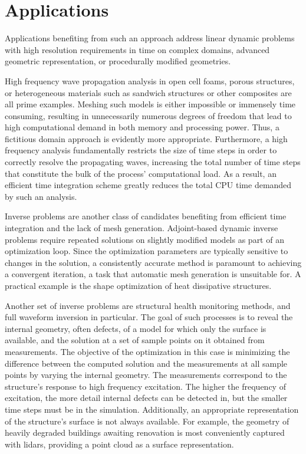 %
\section{Applications}
\label{section:applications}
%

Applications benefiting from such an approach address linear dynamic problems with high resolution requirements in time on complex domains, advanced geometric representation, or procedurally modified geometries.

High frequency wave propagation analysis in open cell foams, porous structures, or heterogeneous materials such as sandwich structures or other composites are all prime examples. Meshing such models is either impossible or immensely time consuming, resulting in unnecessarily numerous degrees of freedom that lead to high computational demand in both memory and processing power. Thus, a fictitious domain approach is evidently more appropriate. Furthermore, a high frequency analysis fundamentally restricts the size of time steps in order to correctly resolve the propagating waves, increasing the total number of time steps that constitute the bulk of the process' computational load. As a result, an efficient time integration scheme greatly reduces the total CPU time demanded by such an analysis.

Inverse problems are another class of candidates benefiting from efficient time integration and the lack of mesh generation. Adjoint-based dynamic inverse problems require repeated solutions on slightly modified models as part of an optimization loop. Since the optimization parameters are typically sensitive to changes in the solution, a consistently accurate method is paramount to achieving a convergent iteration, a task that automatic mesh generation is unsuitable for. A practical example is the shape optimization of heat dissipative structures.

Another set of inverse problems are structural health monitoring methods, and full waveform inversion in particular. The goal of such processes is to reveal the internal geometry, often defects, of a model for which only the surface is available, and the solution at a set of sample points on it obtained from measurements. The objective of the optimization in this case is minimizing the difference between the computed solution and the measurements at all sample points by varying the internal geometry. The measurements correspond to the structure's response to high frequency excitation. The higher the frequency of excitation, the more detail internal defects can be detected in, but the smaller time steps must be in the simulation. Additionally, an appropriate representation of the structure's surface is not always available. For example, the geometry of heavily degraded buildings awaiting renovation is most conveniently captured with lidars, providing a point cloud as a surface representation.